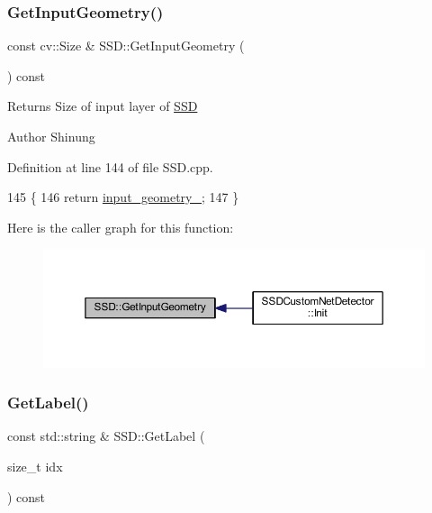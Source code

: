\subsubsection{\texorpdfstring{Get\+Input\+Geometry()}{GetInputGeometry()}}
{\footnotesize\ttfamily const cv\+::\+Size \& S\+S\+D\+::\+Get\+Input\+Geometry (\begin{DoxyParamCaption}{ }\end{DoxyParamCaption}) const}

\begin{DoxyReturn}{Returns}
Size of input layer of \mbox{\hyperlink{class_s_s_d}{S\+SD}} 
\end{DoxyReturn}
\begin{DoxyAuthor}{Author}
Shinung 
\end{DoxyAuthor}


Definition at line 144 of file S\+S\+D.\+cpp.


\begin{DoxyCode}
145 \{
146     \textcolor{keywordflow}{return} \mbox{\hyperlink{class_s_s_d_a3fe828551a5a53a3f43a481ae5d2d96a}{input\_geometry\_}};
147 \}
\end{DoxyCode}
Here is the caller graph for this function\+:\nopagebreak
\begin{figure}[H]
\begin{center}
\leavevmode
\includegraphics[width=350pt]{class_s_s_d_a20f17f5f9dbdc816f7b3ae4e30428427_icgraph}
\end{center}
\end{figure}
\mbox{\label{class_s_s_d_ac5c69f839f08bfa37dd33a66331f6fa3}} 
\subsubsection{\texorpdfstring{Get\+Label()}{GetLabel()}}
{\footnotesize\ttfamily const std\+::string \& S\+S\+D\+::\+Get\+Label (\begin{DoxyParamCaption}\item[{size\+\_\+t}]{idx }\end{DoxyParamCaption}) const}



